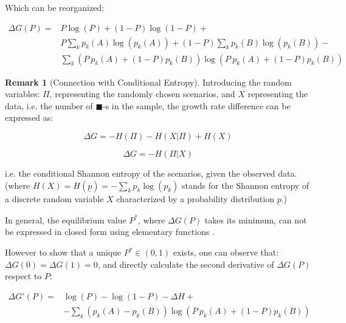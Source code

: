 \documentclass{article}
\newcommand{\bb}{\blacksquare}
\theoremstyle{definition}
\newtheorem*{remark}{Remark}
\begin{document}
Which can be reorganized:

\begin{equation}
    \label{eq:DelataGP}
    \begin{split}
    \Delta G(P) =  & P \log(P) + (1-P) \log(1-P) + \\
                & P \sum_k p_k(A) \log(p_k(A)) + (1-P) \sum_k p_k(B) \log(p_k(B)) - \\
                & \sum_k (P \ p_k(A) + (1-P) p_k(B)) \log(P \ p_k(A) + (1-P) p_k(B))
    \end{split}
\end{equation}

\begin{remark}[Connection with Conditional Entropy]

Introducing the random variables: $\Pi$, representing the randomly chosen scenarios, and $X$ representing the data, i.e. the number of $\bb$-s in the sample, the growth rate difference can be expressed as:

\begin{equation}
    \Delta G = - H(\Pi) - H(X|\Pi) + H(X)  
\end{equation}

\begin{equation}
    \Delta G = - H(\Pi|X)
\end{equation}

i.e. the conditional Shannon entropy \cite{book:InformationTheory} of the scenarios, given the observed data.
(where $H(X)=H(\underline{p})=-\sum_k p_k \log(p_k)$ stands for the Shannon entropy of a discrete random variable $X$ characterized by a probability distribution $\underline{p}$.)

\end{remark}

In general, the equilibrium value $P^*$, where $\Delta G(P)$ takes its minimum, can not be expressed in closed form using elementary functions \cite{paper:ElementaryFunctions}.

However to show that a unique $P^*\in(0,1)$ exists, one can observe that: $\Delta G(0) = \Delta G(1) = 0$, and directly calculate the second derivative of $\Delta G(P)$ respect to $P$:

\begin{equation}
\label{eq:DeltaGPrime(P)}
    \begin{split}
        \Delta G'(P) =& \log(P) - \log(1-P) - \Delta H + \\
        & - \sum_k (p_k(A)-p_k(B)) \log(P \ p_k(A) + (1-P) p_k(B))
    \end{split}
\end{equation}
\end{document}

